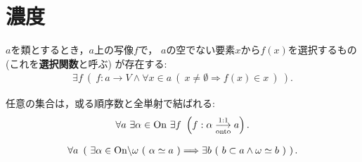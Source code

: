 \section{濃度}
	\begin{screen}
		\begin{axm}[選択公理]
			$a$を類とするとき，$a$上の写像$f$で，
			$a$の空でない要素$x$から$f(x)$を選択するもの
			(これを{\bf 選択関数}と呼ぶ)
			が存在する:
			\begin{align}
				\exists f\ \left(\ 
				f:a \longrightarrow V \wedge \forall x \in a\ 
				(\ x \neq \emptyset \Longrightarrow f(x) \in x\ )\ \right). 
			\end{align}
		\end{axm}
	\end{screen}
	
	\begin{screen}
		\begin{thm}[整列可能定理]
			任意の集合は，或る順序数と全単射で結ばれる:
			\begin{align}
				\forall a\ \exists \alpha \in \ON\ 
				\exists f\ \left( f:\alpha \bij a \right).
			\end{align}
		\end{thm}
	\end{screen}
	
	\begin{screen}
		\begin{dfn}[有限・可算・無限]
			
		\end{dfn}
	\end{screen}
	
	\begin{screen}
		\begin{thm}[任意の無限集合は可算集合を含む]
			\begin{align}
				\forall a\ \left(\ \exists \alpha \in \mathrm{On} \backslash {\bf \omega}\ (\  \alpha \simeq a\ )
				\Longrightarrow \exists b\ (\ b \subset a \wedge {\bf \omega} \simeq b\ )\ \right).
			\end{align}
		\end{thm}
	\end{screen}